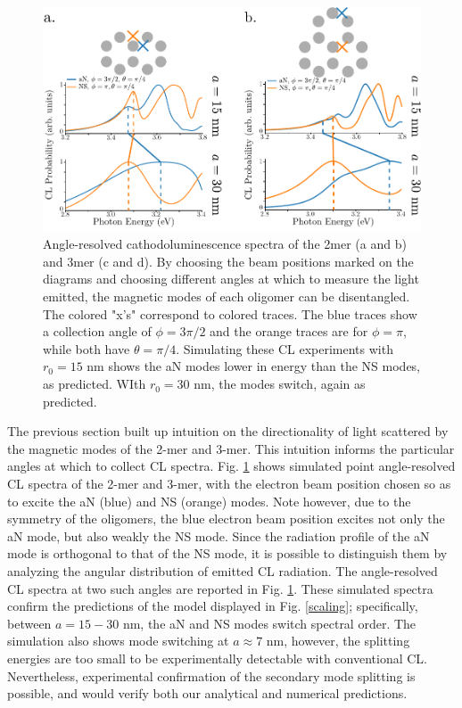 \documentclass[journal=apchd5,manuscript=article]{achemso}
\begin{document}
\begin{figure}
\includegraphics{fig4.pdf}
\caption{Angle-resolved cathodoluminescence spectra of the 2mer (a and b) and 3mer (c and d). By choosing the beam positions marked on the diagrams and choosing different angles at which to measure the light emitted, the magnetic modes of each oligomer can be disentangled. The colored "x's" correspond to colored traces. The blue traces show a collection angle of $\phi = 3\pi/2$ and the orange traces are for $\phi = \pi$, while both have $\theta = \pi/4$. Simulating these CL experiments with $r_0 = 15$ nm shows the aN modes lower in energy than the NS modes, as predicted. WIth $r_0 = 30$ nm, the modes switch, again as predicted.}
\label{CL_2mer_3mer}
\end{figure}
The previous section built up intuition on the directionality of light scattered by the magnetic modes of the 2-mer and 3-mer. This intuition informs the particular angles at which to collect CL spectra. Fig. \ref{CL_2mer_3mer} shows simulated point angle-resolved CL spectra of the 2-mer and 3-mer, with the electron beam position chosen so as to excite the aN (blue) and NS (orange) modes. Note however, due to the symmetry of the oligomers, the blue electron beam position excites not only the aN mode, but also weakly the NS mode. Since the radiation profile of the aN mode is orthogonal to that of the NS mode, it is possible to distinguish them by analyzing the angular distribution of emitted CL radiation. The angle-resolved CL spectra at two such angles are reported in Fig. \ref{CL_2mer_3mer}. These simulated spectra confirm the predictions of the model displayed in Fig. \ref{scaling}; specifically, between $a = 15 - 30$ nm, the aN and NS modes switch spectral order. The simulation also shows mode switching at $a\approx7$ nm, however, the splitting energies are too small to be experimentally detectable with conventional CL. Nevertheless, experimental confirmation of the secondary mode splitting is possible, and would verify both our analytical and numerical predictions.
\end{document}
